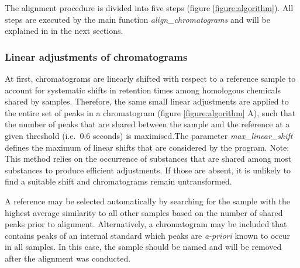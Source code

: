 The alignment procedure is divided into five steps (figure
\ref{figure:algorithm}). All steps are executed by the main function
\textit{align{\_}chromatograms} and will be explained in in the next
sections. \subsubsection{Linear adjustments of chromatograms} At first,
chromatograms are linearly shifted with respect to a reference sample to
account for systematic shifts in retention times among homologous
chemicals shared by samples. Therefore, the same small linear
adjustments are applied to the entire set of peaks in a chromatogram
(figure \ref{figure:algorithm} A), such that the number of peaks that
are shared between the sample and the reference at a given threshold
(i.e.~0.6 seconds) is maximised.The parameter
\textit{max{\_}linear{\_}shift} defines the maximum of linear shifts
that are considered by the program. \newline
Note: This method relies on the occurrence of substances that are shared
among most substances to produce efficient adjustments. If those are
absent, it is unlikely to find a suitable shift and chromatograms remain
untransformed. \par
A reference may be selected automatically by searching for the sample
with the highest average similarity to all other samples based on the
number of shared peaks prior to alignment. Alternatively, a chromatogram
may be included that contains peaks of an internal standard which peaks
are \textit{a-priori} known to occur in all samples. In this case, the
sample should be named  and will be removed after the
alignment was conducted.

\newpage

